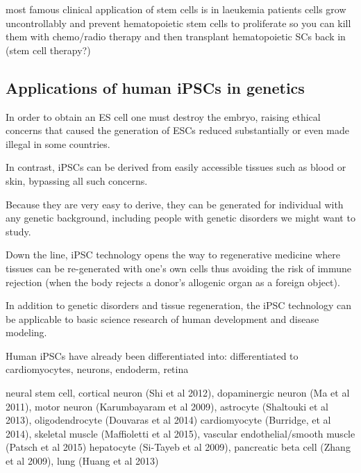 most famous clinical application of stem cells is in laeukemia patients
cells grow uncontrollably and prevent hematopoietic stem cells to proliferate so you can kill them with chemo/radio therapy and then transplant hematopoietic SCs back in (stem cell therapy?)



\subsection{Applications of human iPSCs in genetics}

In order to obtain an ES cell one must destroy the embryo, raising ethical concerns that caused the generation of ESCs reduced substantially or even made illegal in some countries.

In contrast, iPSCs can be derived from easily accessible tissues such as blood or skin, bypassing all such concerns.

Because they are very easy to derive, they can be generated for individual with any genetic background, including people with genetic disorders we might want to study.

Down the line, iPSC technology opens the way to regenerative medicine where tissues can be re-generated with one's own cells thus avoiding the risk of immune rejection (when the body rejects a donor's allogenic organ as a foreign object).

In addition to genetic disorders and tissue regeneration, the iPSC technology can be applicable to basic science research of human development and disease modeling.

Human iPSCs have already been differentiated into: 
differentiated to cardiomyocytes, neurons, endoderm, retina

neural stem cell, cortical neuron (Shi et al 2012), dopaminergic neuron (Ma et al 2011), motor neuron (Karumbayaram et al 2009), astrocyte (Shaltouki et al 2013), oligodendrocyte (Douvaras et al 2014)
cardiomyocyte (Burridge, et al 2014), skeletal muscle (Maffioletti et al 2015), vascular endothelial/smooth muscle (Patsch et al 2015)
hepatocyte (Si-Tayeb et al 2009), pancreatic beta cell (Zhang et al 2009), lung (Huang et al 2013)\\


